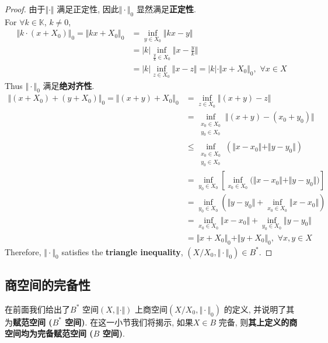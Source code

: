 \begin{defn}
\begin{rmk}
\begin{itemize}
		 		\begin{proof}
		 			由于$\Vert \cdot \Vert$ 满足正定性, 因此$\Vert \cdot \Vert_0$ 显然满足\textbf{正定性}. \\
		 			For $\forall k \in \mathbb{K}$, $k \neq 0$, 
		 			\begin{align}
		 				\Vert k \cdot (x + X_0) \Vert_0 
		 				= \Vert kx + X_0 \Vert_0 
		 				&= \inf_{y \in X_0} \Vert kx - y \Vert \\
		 				&= \left| k \right| \inf_{\tfrac{y}{k} \in X_0} \Vert x - \frac{y}{k} \Vert \\
		 				&= \left| k \right| \inf_{z \in X_0} \Vert x - z \Vert 
		 				= \left| k \right| \cdot \Vert x + X_0 \Vert_0 , \,\, \forall x \in X
		 			\end{align}
	 				Thus $\Vert \cdot \Vert_0$ 满足\textbf{绝对齐性}. 
	 				\begin{align}
	 					\Vert (x + X_0) + (y + X_0) \Vert_0 
	 					= \Vert (x + y) + X_0 \Vert_0 
	 					&= \inf_{z \in X_0} \Vert (x + y) - z \Vert \\
	 					&= \inf_{\substack{x_0 \in X_0 \\ y_0 \in X_0}} \Vert (x + y) - (x_0 + y_0) \Vert \\
	 					&\leq \inf_{\substack{x_0 \in X_0 \\ y_0 \in X_0}} \left( \Vert x - x_0 \Vert + \Vert y - y_0 \Vert \right) \\
	 					&= \inf_{y_0 \in X_0} \left[ \inf_{x_0 \in X_0} \Big( \Vert x - x_0 \Vert + \Vert y - y_0 \Vert \Big) \right] \\
	 					&= \inf_{y_0 \in X_0} \left( \Vert y - y_0 \Vert + \inf_{x_0 \in X_0} \Vert x - x_0 \Vert \right) \\
	 					&= \inf_{x_0 \in X_0} \Vert x - x_0 \Vert + \inf_{y_0 \in X_0} \Vert y - y_0 \Vert \\
	 					&= \Vert x + X_0 \Vert_0 + \Vert y + X_0 \Vert_0 , \,\, \forall x , y \in X
	 				\end{align}
 					Therefore, $\Vert \cdot \Vert_0$ satisfies the \textbf{triangle inequality}, $(X / X_0 , \Vert \cdot \Vert_0) \in B^*$.
		 		\end{proof}
	 		\end{itemize}
		 \end{rmk}
	\end{defn}

\newpage

\subsection{商空间的完备性}
	在前面我们给出了$B^*$ 空间$(X , \Vert \cdot \Vert)$ 上商空间$(X / X_0 , \Vert \cdot \Vert_0)$ 的定义, 并说明了其为\textbf{赋范空间 ($B^*$ 空间)}. 在这一小节我们将揭示, 如果$X \in B$ 完备, 则\textbf{其上定义的商空间均为完备赋范空间 ($B$ 空间)}. 
	

